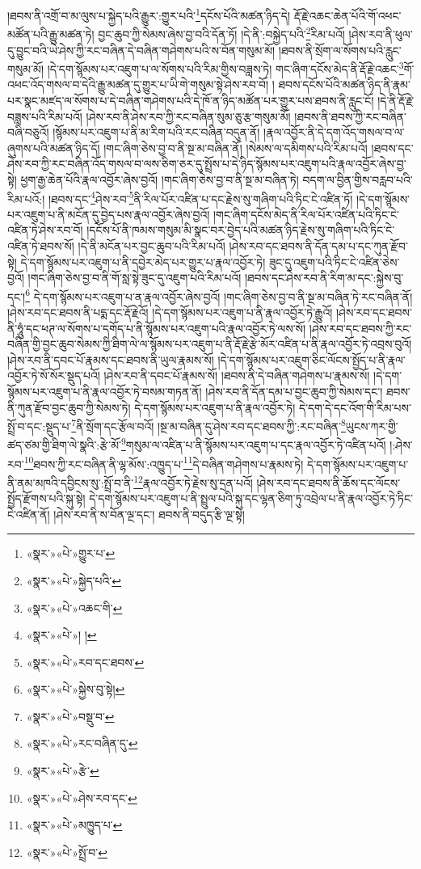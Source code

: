 །ཐབས་ནི་འགྲོ་བ་མ་ལུས་པ་སྐྱེད་པའི་རྒྱུར་:གྱུར་པའི་\footnote{«སྣར་»«པེ་»གྱུར་པ་}དངོས་པོའི་མཚན་ཉིད་དེ། རྡོ་རྗེ་འཆང་ཆེན་པོའི་གོ་འཕང་མཚོན་པའི་རྒྱུ་མཚན་ཏེ། བྱང་ཆུབ་ཀྱི་སེམས་ཞེས་བྱ་བའི་དོན་ཏོ། །དེ་ནི་:བསྐྱེད་པའི་\footnote{«སྣར་»«པེ་»སྐྱེད་པའི་}རིམ་པའོ། །ཤེས་རབ་ནི་ཕུལ་དུ་བྱུང་བའི་ཡེ་ཤེས་ཀྱི་རང་བཞིན་དེ་བཞིན་གཤེགས་པའི་ས་བོན་གསུམ་མོ། །ཐབས་ནི་སྲོག་ལ་སོགས་པའི་རླུང་གསུམ་མོ། །དེ་དག་སྙོམས་པར་འཇུག་པ་ལ་སོགས་པའི་རིམ་གྱིས་བཟླས་ཏེ། གང་ཞིག་དངོས་མེད་ནི་རྡོ་རྗེ་འཆང་\footnote{«སྣར་»«པེ་»འཆང་གི་}གོ་འཕང་འོད་གསལ་བ་དེའི་རྒྱུ་མཚན་དུ་གྱུར་པ་ཡི་གེ་གསུམ་སྟེ་ཤེས་རབ་བོ། །
ཐབས་དངོས་པོའི་མཚན་ཉིད་ནི་རྣམ་པར་སྣང་མཛད་ལ་སོགས་པ་དེ་བཞིན་གཤེགས་པའི་དེ་ཁོ་ན་ཉིད་མཚོན་པར་གྱུར་པས་ཐབས་ནི་རླུང་ངོ། །དེ་ནི་རྡོ་རྗེ་བཟླས་པའི་རིམ་པའོ། །ཤེས་རབ་ནི་ཤེས་རབ་ཀྱི་རང་བཞིན་སུམ་ཅུ་རྩ་གསུམ་མོ། །ཐབས་ནི་ཐབས་ཀྱི་རང་བཞིན་བཞི་བཅུའོ། །སྙོམས་པར་འཇུག་པ་ནི་མ་རིག་པའི་རང་བཞིན་བདུན་ནོ། །རྣལ་འབྱོར་ནི་དེ་དག་འོད་གསལ་བ་ལ་ཞུགས་པའི་མཚན་ཉིད་དོ། །གང་ཞིག་ཅེས་བྱ་བ་ནི་སྔ་མ་བཞིན་ནོ། །སེམས་ལ་དམིགས་པའི་རིམ་པའོ། །ཐབས་དང་ཤེས་རབ་ཀྱི་རང་བཞིན་འོད་གསལ་བ་ལས་ཅིག་ཅར་དུ་སྤྲོས་པ་དེ་ཉིད་སྙོམས་པར་འཇུག་པའི་རྣལ་འབྱོར་ཞེས་བྱ་སྟེ། ཕྱག་རྒྱ་ཆེན་པོའི་རྣལ་འབྱོར་ཞེས་བྱའོ། །གང་ཞིག་ཅེས་བྱ་བ་ནི་སྔ་མ་བཞིན་ཏེ། བདག་ལ་བྱིན་གྱིས་བརླབ་པའི་རིམ་པའོ:། །ཐབས་དང་\footnote{«སྣར་»«པེ་»། །}ཤེས་རབ་\footnote{«སྣར་»«པེ་»རབ་དང་ཐབས་}ནི་རིལ་པོར་འཛིན་པ་དང་རྗེས་སུ་གཞིག་པའི་ཏིང་ངེ་འཛིན་ཏོ། །དེ་དག་སྙོམས་པར་འཇུག་པ་ནི་མངོན་དུ་བྱེད་པས་རྣལ་འབྱོར་ཞེས་བྱའོ། །གང་ཞིག་དངོས་མེད་ནི་རིལ་པོར་འཛིན་པའི་ཏིང་ངེ་འཛིན་ཏེ་ཤེས་རབ་བོ། །དངོས་པོ་ནི་ཁམས་གསུམ་མི་སྣང་བར་བྱེད་པའི་མཚན་ཉིད་རྗེས་སུ་གཞིག་པའི་ཏིང་ངེ་འཛིན་ཏེ་ཐབས་སོ། །དེ་ནི་མངོན་པར་བྱང་ཆུབ་པའི་རིམ་པའོ། །ཤེས་རབ་དང་ཐབས་ནི་དོན་དམ་པ་དང་ཀུན་རྫོབ་སྟེ། དེ་དག་སྙོམས་པར་འཇུག་པ་ནི་དབྱེར་མེད་པར་གྱུར་པ་རྣལ་འབྱོར་ཏེ། ཟུང་དུ་འཇུག་པའི་ཏིང་ངེ་འཛིན་ཅེས་བྱའོ། །གང་ཞིག་ཅེས་བྱ་བ་ནི་གོ་སླ་སྟེ་ཟུང་དུ་འཇུག་པའི་རིམ་པའོ། །ཐབས་དང་ཤེས་རབ་ནི་རིག་མ་དང་:སྐྱེས་བུ་དང་།\footnote{«སྣར་»«པེ་»སྐྱེས་བུ་སྟེ།} དེ་དག་སྙོམས་པར་འཇུག་པ་ན་རྣལ་འབྱོར་ཞེས་བྱའོ། །གང་ཞིག་ཅེས་བྱ་བ་ནི་སྔ་མ་བཞིན་ཏེ་རང་བཞིན་ནོ། །ཤེས་རབ་དང་ཐབས་ནི་པདྨ་དང་རྡོ་རྗེའོ། །དེ་དག་སྙོམས་པར་འཇུག་པ་ནི་རྣལ་འབྱོར་ཏེ་རྒྱུའོ། །ཤེས་རབ་དང་ཐབས་ནི་ཧཱུཾ་དང་ཕཊ་ལ་སོགས་པ་དགོད་པ་ནི་སྙོམས་པར་འཇུག་པའི་རྣལ་འབྱོར་ཏེ་ལས་སོ། །ཤེས་རབ་དང་ཐབས་ཀྱི་རང་བཞིན་གྱི་བྱང་ཆུབ་སེམས་ཀྱི་ཐིག་ལེ་ལ་སྙོམས་པར་འཇུག་པ་ནི་རྡོ་རྗེ་རྩེ་མོར་འཛིན་པ་ནི་རྣལ་འབྱོར་ཏེ་འབྲས་བུའོ། །ཤེས་རབ་ནི་དབང་པོ་རྣམས་དང་ཐབས་ནི་ཡུལ་རྣམས་སོ། །དེ་དག་སྙོམས་པར་འཇུག་ཅིང་ལོངས་སྤྱོད་པ་ནི་རྣལ་འབྱོར་ཏེ་སོ་སོར་སྡུད་པའོ། །ཤེས་རབ་ནི་དབང་པོ་རྣམས་སོ། །ཐབས་ནི་དེ་བཞིན་གཤེགས་པ་རྣམས་སོ། །དེ་དག་སྙོམས་པར་འཇུག་པ་ནི་རྣལ་འབྱོར་ཏེ་བསམ་གཏན་ནོ། །ཤེས་རབ་ནི་དོན་དམ་པ་བྱང་ཆུབ་ཀྱི་སེམས་དང་། ཐབས་ནི་ཀུན་རྫོབ་བྱང་ཆུབ་ཀྱི་སེམས་ཏེ། དེ་དག་སྙོམས་པར་འཇུག་པ་ནི་རྣལ་འབྱོར་ཏེ། དེ་དག་དེ་དང་འོག་གི་རིམ་པས་སྤྲོ་བ་དང་:སྡུད་པ་\footnote{«སྣར་»«པེ་»བསྡུ་བ་}ནི་སྲོག་དང་རྩོལ་བའོ། །སྔ་མ་བཞིན་དུ་ཤེས་རབ་དང་ཐབས་ཀྱི་:རང་བཞིན་\footnote{«སྣར་»«པེ་»རང་བཞིན་དུ་}ཡུངས་ཀར་གྱི་ཚད་ཙམ་གྱི་ཐིག་ལེ་སྣའི་:རྩེ་མོ་\footnote{«སྣར་»«པེ་»རྩེ་}གསུམ་ལ་འཛིན་པ་ནི་སྙོམས་པར་འཇུག་པ་དང་རྣལ་འབྱོར་ཏེ་འཛིན་པའོ། །:ཤེས་རབ་\footnote{«སྣར་»«པེ་»ཤེས་རབ་དང་}ཐབས་ཀྱི་རང་བཞིན་ནི་ལྷ་མོས་:འཁྱུད་པ་\footnote{«སྣར་»«པེ་»མཁྱུད་པ་}དེ་བཞིན་གཤེགས་པ་རྣམས་ཏེ། དེ་དག་སྙོམས་པར་འཇུག་པ་ནི་ནམ་མཁའི་དབྱིངས་སུ་:སྤྲོ་བ་ནི་\footnote{«སྣར་»«པེ་»སྤྲོ་བ་}རྣལ་འབྱོར་ཏེ་རྗེས་སུ་དྲན་པའོ། །ཤེས་རབ་དང་ཐབས་ནི་ཆོས་དང་ལོངས་སྤྱོད་རྫོགས་པའི་སྐུ་སྟེ། དེ་དག་སྙོམས་པར་འཇུག་པ་ནི་སྤྲུལ་པའི་སྐུ་དང་ལྷན་ཅིག་ཏུ་འབྲེལ་པ་ནི་རྣལ་འབྱོར་ཏེ་ཏིང་ངེ་འཛིན་ནོ། །ཤེས་རབ་ནི་ས་བོན་ལྔ་དང་། ཐབས་ནི་བདུད་རྩི་ལྔ་སྟེ། 